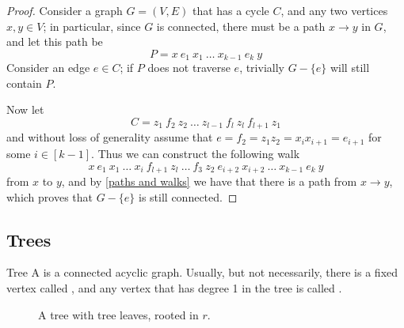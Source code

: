 \documentclass[a4paper, 12pt]{report}
\begin{document}
    \begin{proof}
        Consider a graph $G = (V, E)$ that has a cycle $C$, and any two vertices $x, y \in V$; in particular, since $G$ is connected, there must be a path $x \to y$ in $G$, and let this path be $$P = x \ e_1 \ x_1 \ \ldots \ x_{k - 1} \ e_k \ y$$ Consider an edge $e \in C$; if $P$ does not traverse $e$, trivially $G - \{e\}$ will still contain $P$.

        Now let $$C = z_1 \ f_2 \ z_2 \ \ldots \ z_{l- 1} \ f_l \ z_l \ f_{l + 1} \ z_1$$ and without loss of generality assume that $e = f_2 = z_1 z_2 = x_i x_{i + 1} = e_{i + 1}$ for some $i \in [k - 1]$. Thus we can construct the following walk $$x \ e_1 \ x_1 \ \ldots \ x_i \ f_{l + 1} \ z_l \ \ldots \ f_3 \ z_2 \ e_{i + 2} \ x_{i + 2} \ \ldots \ x_{k - 1} \ e_k \ y$$ from $x$ to $y$, and by \cref{paths and walks} we have that there is a path from $x \to y$, which proves that $G - \{e\}$ is still connected.
    \end{proof}

    \subsection{Trees}

    \begin{frameddefn}{Tree}
        A  is a connected acyclic graph. Usually, but not necessarily, there is a fixed vertex called , and any vertex that has degree 1 in the tree is called .
    \end{frameddefn}
    
    \begin{figure}[H]
        \centering
        \caption{A tree with tree leaves, rooted in $r$.}
    \end{figure}
\end{document}
